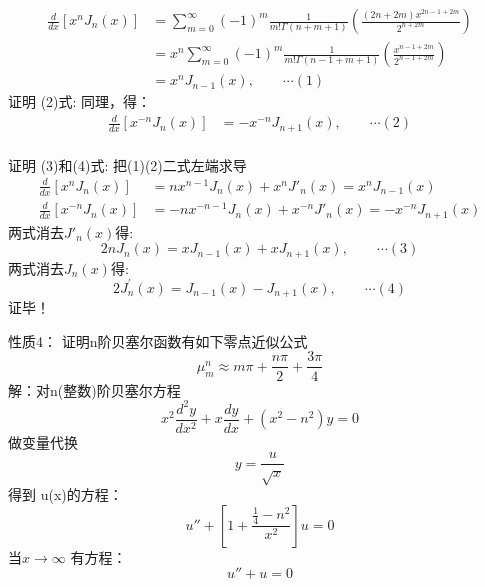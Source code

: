 	\begin{equation*}
		\begin{split}
			\frac{d}{dx} [x^n J_n(x)] &=\sum\limits_{m=0}^{\infty} (-1)^m  
			\frac{1}{m! \Gamma(n+m+1) } (\frac{(2n+2m)x^{2n-1+2m}}{2^{n+2m}})\\
			&=x^n\sum\limits_{m=0}^{\infty} (-1)^m  
			\frac{1}{m! \Gamma(n-1+m+1) } (\frac{x^{n-1+2m}}{2^{n-1+2m}})\\ 
			&=x^n J_{n-1}(x) ,\qquad \cdots (1) 
		\end{split}
	\end{equation*}	
	{\alert{证明 (2)式}}: 同理，得：
	\begin{equation*}
		\begin{split}
		\frac{d}{d x}\left[x^{-n} J_{n}(x)\right]&=-x^{-n} J_{n+1}(x) ,\qquad \cdots (2) \\
		\end{split}
	\end{equation*}	 



	{\alert{证明 (3)和(4)式}}: 把(1)(2)二式左端求导
	\begin{equation*}
		\begin{split}
			\frac{d}{dx} [x^n J_n(x)] &=n x^{n-1} J_n(x) + x^n J'_n(x)=x^n J_{n-1}(x) \\
			\frac{d}{d x}\left[x^{-n} J_{n}(x)\right]&=-n x^{-n-1} J_n(x) + x^{-n} J'_n(x)= -x^{-n} J_{n+1}(x)
		\end{split}
	\end{equation*}	
两式消去$J'_n(x)$得:
	\begin{equation*}
		2 n J_{n}(x)=x J_{n-1}(x)+x J_{n+1}(x)  ,\qquad \cdots (3)
	\end{equation*}	 	
两式消去$J_n(x)$得:
	\begin{equation*}
	2 J_{n}^{\prime}(x)=J_{n-1}(x)-J_{n+1}(x)  ,\qquad \cdots (4)
	\end{equation*}	 
{\alert{证毕！} }



	{\alert{性质4：}} 证明n阶贝塞尔函数有如下零点近似公式
	\[ \mu_{m}^{n} \approx m \pi+\frac{n \pi}{2}+\frac{3 \pi}{4}\]
	{\alert{解：}}对n(整数)阶贝塞尔方程
	\begin{equation*}
		x^2\frac{d^2y}{dx^2} + x\frac{dy}{dx} +(x^2 -n^2)y=0
	\end{equation*}
	做变量代换 \[ y=\frac{u}{\sqrt{x}}\] 
	得到 u(x)的方程：
	\begin{equation*}
		u'' +[1+\frac{\frac{1}{4}-n^2}{x^2}] u=0
	\end{equation*}
	当$x \to \infty $ 有方程：
	\begin{equation*}
		u'' + u=0 
	\end{equation*}	



